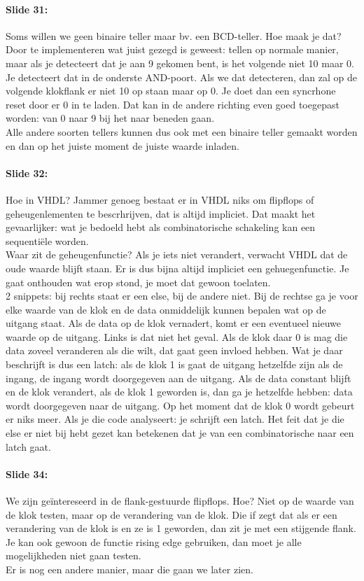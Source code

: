 \documentclass[10pt,a4paper]{book}
\begin{document}
\paragraph{Slide 31:} Soms willen we geen binaire teller maar bv. een BCD-teller. Hoe maak je dat? Door te implementeren wat juist gezegd is geweest: tellen op normale manier, maar als je detecteert dat je aan 9 gekomen bent, is het volgende niet 10 maar 0. Je detecteert dat in de onderste AND-poort. Als we dat detecteren, dan zal op de volgende klokflank er niet 10 op staan maar op 0. Je doet dan een syncrhone reset door er 0 in te laden. Dat kan in de andere richting even goed toegepast worden: van 0 naar 9 bij het naar beneden gaan.\\
Alle andere soorten tellers kunnen dus ook met een binaire teller gemaakt worden en dan op het juiste moment de juiste waarde inladen. 

\paragraph{Slide 32:} Hoe in VHDL? Jammer genoeg bestaat er in VHDL niks om flipflops of geheugenlementen te bescrhrijven, dat is altijd impliciet. Dat maakt het gevaarlijker: wat je bedoeld hebt als combinatorische schakeling kan een sequenti\"ele worden.\\
Waar zit de geheugenfunctie? Als je iets niet verandert, verwacht VHDL dat de oude waarde blijft staan. Er is dus bijna altijd impliciet een gehuegenfunctie. Je gaat onthouden wat erop stond, je moet dat gewoon toelaten.\\
2 snippets: bij rechts staat er een else, bij de andere niet. Bij de rechtse ga je voor elke waarde van de klok en de data onmiddelijk kunnen bepalen wat op de uitgang staat. Als de data op de klok vernadert, komt er een eventueel nieuwe waarde op de uitgang. Links is dat niet het geval. Als de klok daar 0 is mag die data zoveel veranderen als die wilt, dat gaat geen invloed hebben. Wat je daar beschrijft is dus een latch: als de klok 1 is gaat de uitgang hetzelfde zijn als de ingang, de ingang wordt doorgegeven aan de uitgang. Als de data constant blijft en de klok verandert, als de klok 1 geworden is, dan ga je hetzelfde hebben: data wordt doorgegeven naar de uitgang. Op het moment dat de klok 0 wordt gebeurt er niks meer. Als je die code analyseert: je schrijft een latch. Het feit dat je die else er niet bij hebt gezet kan betekenen dat je van een combinatorische naar een latch gaat. 

\paragraph{Slide 34:} We zijn ge\"intereseerd in de flank-gestuurde flipflops. Hoe? Niet op de waarde van de klok testen, maar op de verandering van de klok. Die if zegt dat als er een verandering van de klok is en ze is 1 geworden, dan zit je met een stijgende flank. Je kan ook gewoon de functie rising edge gebruiken, dan moet je alle mogelijkheden niet gaan testen.\\
Er is nog een andere manier, maar die gaan we later zien. 
\end{document}
